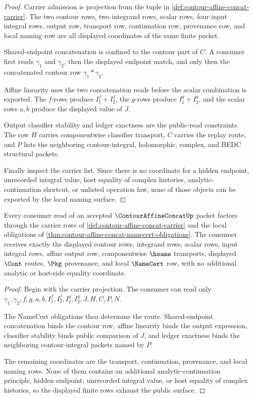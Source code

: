 \begin{proof}
Carrier admission is projection from the tuple in \autoref{def:contour-affine-concat-carrier}. The two contour rows, two integrand rows, scalar rows, four input integral rows, output row, transport row, continuation row, provenance row, and local naming row are all displayed coordinates of the same finite packet.

Shared-endpoint concatenation is confined to the contour part of $C$. A consumer first reads $\gamma_1$ and $\gamma_2$, then the displayed endpoint match, and only then the concatenated contour row $\gamma_1\ast\gamma_2$.

Affine linearity uses the two concatenation reads before the scalar combination is exported. The $f$-rows produce $I_1^f+I_2^f$, the $g$-rows produce $I_1^g+I_2^g$, and the scalar rows $a,b$ produce the displayed value of $J$.

Output classifier stability and ledger exactness are the public-read constraints. The row $H$ carries componentwise classifier transport, $C$ carries the replay route, and $P$ lists the neighboring contour-integral, holomorphic, complex, and BEDC structural packets.

Finally inspect the carrier list. Since there is no coordinate for a hidden endpoint, unrecorded integral value, host equality of complex histories, analytic-continuation shortcut, or unlisted operation law, none of those objects can be exported by the local naming surface.
\end{proof}

\begin{theorem}
\label{thm:contour-affine-concat-consumer-exhaustion}
Every consumer read of an accepted $\ContourAffineConcatUp$ packet factors through the carrier rows of \autoref{def:contour-affine-concat-carrier} and the local obligations of \autoref{thm:contour-affine-concat-namecert-obligations}. The consumer receives exactly the displayed contour rows, integrand rows, scalar rows, input integral rows, affine output row, componentwise $\hsame$ transports, displayed $\Cont$ routes, $\Pkg$ provenance, and local $\NameCert$ row, with no additional analytic or host-side equality coordinate.
\end{theorem}
\begin{proof}
Begin with the carrier projection. The consumer can read only $\gamma_1,\gamma_2,f,g,a,b,I_1^f,I_2^f,I_1^g,I_2^g,J,H,C,P,N$.

The NameCert obligations then determine the route. Shared-endpoint concatenation binds the contour row, affine linearity binds the output expression, classifier stability binds public comparison of $J$, and ledger exactness binds the neighboring contour-integral packets named by $P$.

The remaining coordinates are the transport, continuation, provenance, and local naming rows. None of them contains an additional analytic-continuation principle, hidden endpoint, unrecorded integral value, or host equality of complex histories, so the displayed finite rows exhaust the public surface.
\end{proof}

